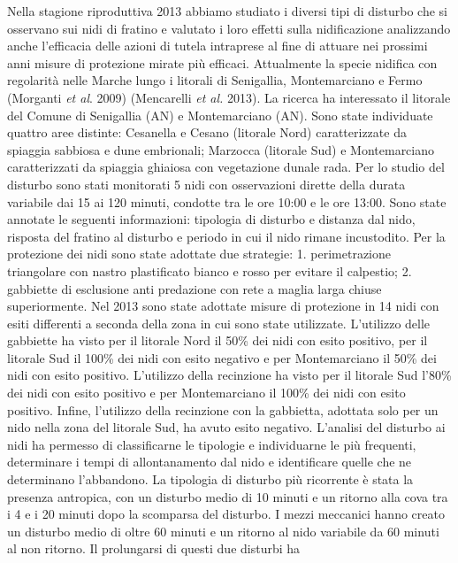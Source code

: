 Nella stagione riproduttiva 2013 abbiamo studiato i diversi tipi di
disturbo che si osservano sui nidi di fratino e valutato i loro effetti
sulla nidificazione analizzando anche l'efficacia
delle azioni di tutela intraprese al fine di attuare nei prossimi anni
misure di protezione mirate pi\`u efficaci. Attualmente la specie
nidifica con regolarit\`a nelle Marche lungo i litorali di Senigallia,
Montemarciano e Fermo (Morganti \textit{et al}. 2009) (Mencarelli
\textit{et al. }2013). La ricerca ha interessato il litorale del Comune
di Senigallia (AN) e Montemarciano (AN). Sono state individuate quattro
aree distinte: Cesanella e Cesano (litorale Nord) caratterizzate da
spiaggia sabbiosa e dune embrionali; Marzocca (litorale Sud) e
Montemarciano caratterizzati da spiaggia ghiaiosa con vegetazione
dunale rada. Per lo studio del disturbo sono stati monitorati 5 nidi
con osservazioni dirette della durata variabile dai 15 ai 120 minuti,
condotte tra le ore 10:00 e le ore 13:00. Sono state annotate le
seguenti informazioni: tipologia di disturbo e distanza dal nido,
risposta del fratino al disturbo e periodo in cui il nido rimane
incustodito. Per la protezione dei nidi sono state adottate due
strategie: 1. perimetrazione triangolare con nastro plastificato bianco
e rosso per evitare il calpestio; 2. gabbiette di esclusione anti
predazione con rete a maglia larga chiuse superiormente. Nel 2013 sono
state adottate misure di protezione in 14 nidi con esiti differenti a
seconda della zona in cui sono state utilizzate.
L{\textquoteright}utilizzo delle gabbiette ha visto per il litorale
Nord il 50\% dei nidi con esito positivo, per il litorale Sud il 100\%
dei nidi con esito negativo e per Montemarciano il 50\% dei nidi con
esito positivo. L{\textquoteright}utilizzo della recinzione ha visto
per il litorale Sud l{\textquoteright}80\% dei nidi con esito positivo
e per Montemarciano il 100\% dei nidi con esito positivo. Infine,
l{\textquoteright}utilizzo della recinzione con la gabbietta, adottata
solo per un nido nella zona del litorale Sud, ha avuto esito negativo.
L'analisi del disturbo ai nidi ha permesso di
classificarne le tipologie e individuarne le pi\`u frequenti,
determinare i tempi di allontanamento dal nido e identificare quelle
che ne determinano l'abbandono. La tipologia di
disturbo pi\`u ricorrente \`e stata la presenza antropica, con un
disturbo medio di 10 minuti e un ritorno alla cova tra i 4 e i 20
minuti dopo la scomparsa del disturbo. I mezzi meccanici hanno creato
un disturbo medio di oltre 60 minuti e un ritorno al nido variabile da
60 minuti al non ritorno. Il prolungarsi di questi due disturbi ha
